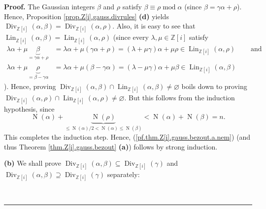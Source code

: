 \documentclass[numbers=enddot,12pt,final,onecolumn,notitlepage]{scrartcl}%
\numberwithin{exer}{subsection}
\theoremstyle{definition}
\newenvironment{proof}[1][Proof]{\noindent\textbf{#1.} }{\ \rule{0.5em}{0.5em}}
\begin{document}
\begin{proof}
The Gaussian integers $\beta$ and $\rho$ satisfy $\beta\equiv\rho
\operatorname{mod}\alpha$ (since $\beta=\gamma\alpha+\rho$). Hence,
Proposition \ref{prop.Z[i].gauss.divrules} \textbf{(d)} yields
$\operatorname*{Div}\nolimits_{\mathbb{Z}\left[  i\right]  }\left(
\alpha,\beta\right)  =\operatorname*{Div}\nolimits_{\mathbb{Z}\left[
i\right]  }\left(  \alpha,\rho\right)  $. Also, it is easy to see that
$\operatorname*{Lin}\nolimits_{\mathbb{Z}\left[  i\right]  }\left(
\alpha,\beta\right)  =\operatorname*{Lin}\nolimits_{\mathbb{Z}\left[
i\right]  }\left(  \alpha,\rho\right)  $ (since every $\lambda,\mu
\in\mathbb{Z}\left[  i\right]  $ satisfy%
\begin{align*}
\lambda\alpha+\mu\underbrace{\beta}_{=\gamma\alpha+\rho}  &  =\lambda
\alpha+\mu\left(  \gamma\alpha+\rho\right)  =\left(  \lambda+\mu\gamma\right)
\alpha+\mu\rho\in\operatorname*{Lin}\nolimits_{\mathbb{Z}\left[  i\right]
}\left(  \alpha,\rho\right)  \ \ \ \ \ \ \ \ \ \ \text{and}\\
\lambda\alpha+\mu\underbrace{\rho}_{=\beta-\gamma\alpha}  &  =\lambda
\alpha+\mu\left(  \beta-\gamma\alpha\right)  =\left(  \lambda-\mu
\gamma\right)  \alpha+\mu\beta\in\operatorname*{Lin}\nolimits_{\mathbb{Z}%
\left[  i\right]  }\left(  \alpha,\beta\right)
\end{align*}
). Hence, proving $\operatorname*{Div}\nolimits_{\mathbb{Z}\left[  i\right]
}\left(  \alpha,\beta\right)  \cap\operatorname*{Lin}\nolimits_{\mathbb{Z}%
\left[  i\right]  }\left(  \alpha,\beta\right)  \neq\varnothing$ boils down to
proving $\operatorname*{Div}\nolimits_{\mathbb{Z}\left[  i\right]  }\left(
\alpha,\rho\right)  \cap\operatorname*{Lin}\nolimits_{\mathbb{Z}\left[
i\right]  }\left(  \alpha,\rho\right)  \neq\varnothing$. But this follows from
the induction hypothesis, since%
\[
\operatorname*{N}\left(  \alpha\right)  +\underbrace{\operatorname*{N}\left(
\rho\right)  }_{\leq\operatorname*{N}\left(  \alpha\right)
/2<\operatorname*{N}\left(  \alpha\right)  \leq\operatorname*{N}\left(
\beta\right)  }<\operatorname*{N}\left(  \alpha\right)  +\operatorname*{N}%
\left(  \beta\right)  =n.
\]
This completes the induction step. Hence,
(\ref{pf.thm.Z[i].gauss.bezout.a.nem}) (and thus Theorem
\ref{thm.Z[i].gauss.bezout} \textbf{(a)}) follows by strong induction.

\textbf{(b)} We shall prove $\operatorname*{Div}\nolimits_{\mathbb{Z}\left[
i\right]  }\left(  \alpha,\beta\right)  \subseteq\operatorname*{Div}%
\nolimits_{\mathbb{Z}\left[  i\right]  }\left(  \gamma\right)  $ and
$\operatorname*{Div}\nolimits_{\mathbb{Z}\left[  i\right]  }\left(
\alpha,\beta\right)  \supseteq\operatorname*{Div}\nolimits_{\mathbb{Z}\left[
i\right]  }\left(  \gamma\right)  $ separately:


\end{proof}
\end{document}
